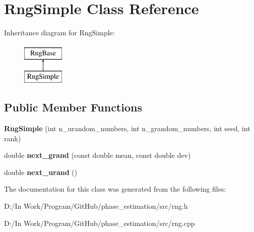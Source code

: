 \hypertarget{classRngSimple}{}\section{Rng\+Simple Class Reference}
\label{classRngSimple}
Inheritance diagram for Rng\+Simple\+:\begin{figure}[H]
\begin{center}
\leavevmode
\includegraphics[height=2.000000cm]{classRngSimple}
\end{center}
\end{figure}
\subsection*{Public Member Functions}
\begin{DoxyCompactItemize}
\item 
\hypertarget{classRngSimple_a088385f8187d6f0ef7b38a39aa7340b4}{}{\bfseries Rng\+Simple} (int n\+\_\+urandom\+\_\+numbers, int n\+\_\+grandom\+\_\+numbers, int seed, int rank)\label{classRngSimple_a088385f8187d6f0ef7b38a39aa7340b4}

\item 
\hypertarget{classRngSimple_aba8d9e124fce30709c6056b50cd9dd5f}{}double {\bfseries next\+\_\+grand} (const double mean, const double dev)\label{classRngSimple_aba8d9e124fce30709c6056b50cd9dd5f}

\item 
\hypertarget{classRngSimple_a71c2deaf7fdf5c4f5379293021344aae}{}double {\bfseries next\+\_\+urand} ()\label{classRngSimple_a71c2deaf7fdf5c4f5379293021344aae}

\end{DoxyCompactItemize}


The documentation for this class was generated from the following files\+:\begin{DoxyCompactItemize}
\item 
D\+:/\+In Work/\+Program/\+Git\+Hub/phase\+\_\+estimation/src/rng.\+h\item 
D\+:/\+In Work/\+Program/\+Git\+Hub/phase\+\_\+estimation/src/rng.\+cpp\end{DoxyCompactItemize}
